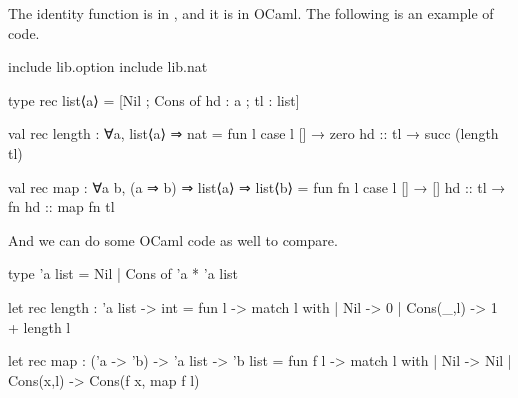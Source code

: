The identity function is  in \pml, and it is  in OCaml. The following is an example of \pml code.
\begin{pmlcode}
include lib.option
include lib.nat

type rec list⟨a⟩ = [Nil ; Cons of {hd : a ; tl : list}]

val rec length : ∀a, list⟨a⟩ ⇒ nat =
  fun l {
    case l {
      []       → zero
      hd :: tl → succ (length tl)
    }
  }

val rec map : ∀a b, (a ⇒ b) ⇒ list⟨a⟩ ⇒ list⟨b⟩ =
  fun fn l {
    case l {
      []       → []
      hd :: tl → fn hd :: map fn tl
    }
  }
\end{pmlcode}

And we can do some OCaml code as well to compare.
\begin{camlcode}
type 'a list = Nil | Cons of 'a * 'a list

let rec length : 'a list -> int = fun l ->
  match l with
  | Nil       -> 0
  | Cons(_,l) -> 1 + length l

let rec map : ('a -> 'b) -> 'a list -> 'b list = fun f l ->
  match l with
  | Nil       -> Nil
  | Cons(x,l) -> Cons(f x, map f l)
\end{camlcode}
